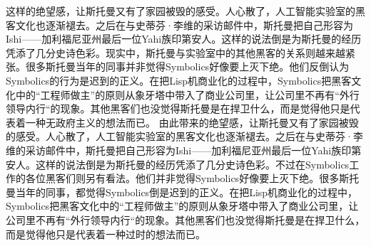 \ifdefined\chs
\ifdefined\vone
这样的绝望感，让斯托曼又有了家园被毁的感受。人心散了，人工智能实验室的黑客文化也逐渐褪去。之后在与史蒂芬·李维的采访邮件中，斯托曼把自己形容为Ishi——加利福尼亚州最后一位Yahi族印第安人。这样的说法倒是为斯托曼的经历凭添了几分史诗色彩。现实中，斯托曼与实验室中的其他黑客的关系则越来越紧张。很多斯托曼当年的同事并非觉得Symbolics好像要上灭下绝。他们反倒认为Symbolics的行为是迟到的正义。在把Lisp机商业化的过程中，Symbolics把黑客文化中的``工程师做主''的原则从象牙塔中带入了商业公司里，让公司里不再有``外行领导内行``的现象。其他黑客们也没觉得斯托曼是在捍卫什么，而是觉得他只是代表着一种无政府主义的想法而已。
\fi
\ifdefined\vtwo
由此带来的绝望感，让斯托曼又有了家园被毁的感受。人心散了，人工智能实验室的黑客文化也逐渐褪去。之后在与史蒂芬·李维的采访邮件中，斯托曼把自己形容为Ishi——加利福尼亚州最后一位Yahi族印第安人。这样的说法倒是为斯托曼的经历凭添了几分史诗色彩。不过在Symbolics工作的各位黑客们则另有看法。他们并非觉得Symbolics好像要上灭下绝。很多斯托曼当年的同事，都觉得Symbolics倒是迟到的正义。在把Lisp机商业化的过程中，Symbolics把黑客文化中的``工程师做主''的原则从象牙塔中带入了商业公司里，让公司里不再有``外行领导内行``的现象。其他黑客们也没觉得斯托曼是在捍卫什么，而是觉得他只是代表着一种过时的想法而已。
\fi
\fi


